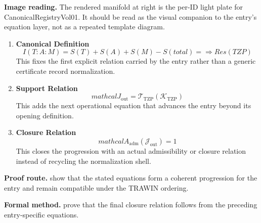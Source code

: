 \begin{samepage}
\noindent\begin{minipage}[t]{0.45\linewidth}
\vspace{0pt}
\raggedright
\scriptsize\textbf{Image reading.} The rendered manifold at right is the per-ID light plate for CanonicalRegistryVol01. It should be read as the visual companion to the entry's equation layer, not as a repeated template diagram.\par
\end{minipage}\hfill
\begin{minipage}[t]{0.53\linewidth}
\vspace*{-0.10in}
\raggedright
{}
\end{minipage}
\end{samepage}

\clearpage


\begin{enumerate}[leftmargin=1.6em,itemsep=9pt,topsep=6pt]
\item \textbf{Canonical Definition}
\[
I(T : A :M) = S(T ) + S(A) + S(M)- S(total) =⇒ Res(TZP )
\]
This fixes the first explicit relation carried by the entry rather than a generic certificate record normalization.

\item \textbf{Support Relation}
\[
mathcal{J}_{\mathrm{out}} = \mathcal{T}_{\mathrm{TZP}}\!\left(\mathcal{K}_{\mathrm{TZP}}\right)
\]
This adds the next operational equation that advances the entry beyond its opening definition.

\item \textbf{Closure Relation}
\[
mathcal{A}_{\mathrm{adm}}\!\left(\mathcal{J}_{\mathrm{out}}\right)=1
\]
This closes the progression with an actual admissibility or closure relation instead of recycling the normalization shell.
\end{enumerate}

\textbf{Proof route.} show that the stated equations form a coherent progression for the entry and remain compatible under the TRAWIN ordering.

\textbf{Formal method.} prove that the final closure relation follows from the preceding entry-specific equations.

\medskip
{}

